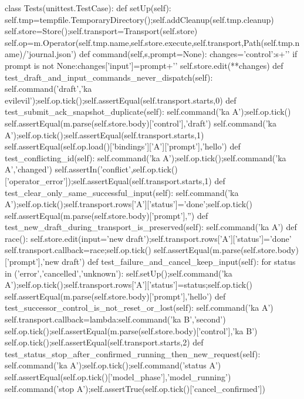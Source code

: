 class Tests(unittest.TestCase):
    def setUp(self):
        self.tmp=tempfile.TemporaryDirectory();self.addCleanup(self.tmp.cleanup)
        self.store=Store();self.transport=Transport(self.store)
        self.op=m.Operator(self.tmp.name,self.store.execute,self.transport,Path(self.tmp.name)/'journal.json')
    def command(self,s,prompt=None):
        changes={'control':s+'\n'}
        if prompt is not None:changes['input']=prompt+'\n'
        self.store.edit(**changes)
    def test_draft_and_input_commands_never_dispatch(self):
        self.command('draft','ka evil\nstop evil');self.op.tick();self.assertEqual(self.transport.starts,0)
    def test_submit_ack_snapshot_duplicate(self):
        self.command('ka A');self.op.tick()
        self.assertEqual(m.parse(self.store.body)['control'],'draft')
        self.command('ka A');self.op.tick();self.assertEqual(self.transport.starts,1)
        self.assertEqual(self.op.load()['bindings']['A']['prompt'],'hello')
    def test_conflicting_id(self):
        self.command('ka A');self.op.tick();self.command('ka A','changed')
        self.assertIn('conflict',self.op.tick()['operator_error']);self.assertEqual(self.transport.starts,1)
    def test_clear_only_same_successful_input(self):
        self.command('ka A');self.op.tick();self.transport.rows['A']['status']='done';self.op.tick()
        self.assertEqual(m.parse(self.store.body)['prompt'],'')
    def test_new_draft_during_transport_is_preserved(self):
        self.command('ka A')
        def race():
            self.store.edit(input='new draft\n');self.transport.rows['A']['status']='done'
        self.transport.callback=race;self.op.tick()
        self.assertEqual(m.parse(self.store.body)['prompt'],'new draft')
    def test_failure_and_cancel_keep_input(self):
        for status in ('error','cancelled','unknown'):
            self.setUp();self.command('ka A');self.op.tick();self.transport.rows['A']['status']=status;self.op.tick()
            self.assertEqual(m.parse(self.store.body)['prompt'],'hello')
    def test_successor_control_is_not_reset_or_lost(self):
        self.command('ka A')
        self.transport.callback=lambda:self.command('ka B','second')
        self.op.tick();self.assertEqual(m.parse(self.store.body)['control'],'ka B')
        self.op.tick();self.assertEqual(self.transport.starts,2)
    def test_status_stop_after_confirmed_running_then_new_request(self):
        self.command('ka A');self.op.tick();self.command('status A')
        self.assertEqual(self.op.tick()['model_phase'],'model_running')
        self.command('stop A');self.assertTrue(self.op.tick()['cancel_confirmed'])
